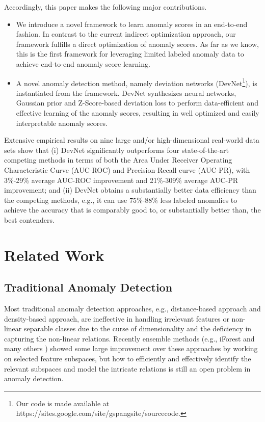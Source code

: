 \documentclass[sigconf]{acmart}
\begin{document}
Accordingly, this paper makes the following major contributions.
\begin{itemize}
    \item We introduce a novel framework to learn anomaly scores in an end-to-end fashion. In contrast to the current indirect optimization approach, our framework fulfills a direct optimization of anomaly scores. As far as we know, this is the first framework for leveraging limited labeled anomaly data to achieve end-to-end anomaly score learning.
    \item A novel anomaly detection method, namely deviation networks (DevNet\footnote{Our code is made available at https://sites.google.com/site/gspangsite/sourcecode.}), is instantiated from the framework. DevNet synthesizes neural networks, Gaussian prior and Z-Score-based deviation loss to perform data-efficient and effective learning of the anomaly scores, resulting in well optimized and easily interpretable anomaly scores.
\end{itemize}
Extensive empirical results on nine large and/or high-dimensional real-world data sets show that (i) DevNet significantly outperforms four state-of-the-art competing methods in terms of both the Area Under Receiver Operating Characteristic Curve (AUC-ROC) and Precision-Recall curve (AUC-PR), with 3\%-29\% average AUC-ROC improvement and 21\%-309\% average AUC-PR improvement; and (ii) DevNet obtains a substantially better data efficiency than the competing methods, e.g., it can use 75\%-88\% less labeled anomalies to achieve the accuracy that is comparably good to, or substantially better than, the best contenders. 

\section{Related Work}
\subsection{Traditional Anomaly Detection}

Most traditional anomaly detection approaches, e.g., distance-based approach and density-based approach, are ineffective in handling irrelevant features or non-linear separable classes due to the curse of dimensionality and the deficiency in capturing the non-linear relations. Recently ensemble methods (e.g., iForest \cite{liu2012iforest} and many others \cite{keller2012hics,pang2018sparse}) showed some large improvement over these approaches by working on selected feature subspaces, but how to efficiently and effectively identify the relevant subspaces and model the intricate relations is still an open problem in anomaly detection. 
\end{document}
